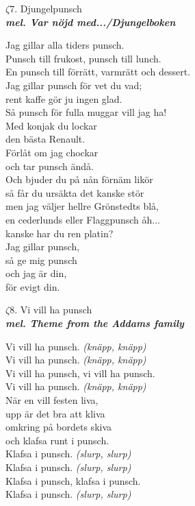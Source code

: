 \documentclass[a6paper,10pt]{article}
\newcommand{\mel}[1]{\small\textbf{\textit{mel. #1 \\}}}
\begin{document}
\setlength{\oddsidemargin}{-0.37in}
\noindent
\begin{center}
\Large $\zeta7$. Djungelpunsch \\ 
\mel{Var nöjd med.../Djungelboken}
\end{center}
Jag gillar alla tiders punsch.\\
Punsch till frukost, punsch till lunch.\\
En punsch till förrätt, varmrätt och dessert.\\
Jag gillar punsch för vet du vad;\\
rent kaffe gör ju ingen glad.\\
Så punsch för fulla muggar vill jag ha!
\vspace{5pt}\\
Med konjak du lockar\\
den bästa Renault.\\
Förlåt om jag chockar\\
och tar punsch ändå.\\
Och bjuder du på nån förnäm likör\\
så får du ursäkta det kanske stör\\
men jag väljer hellre Grönstedts blå,\\
en cederlunds eller Flaggpunsch åh...\\
kanske har du ren platin?\\
Jag gillar punsch,\\
så ge mig punsch\\
och jag är din,\\
för evigt din.\\

\setlength{\oddsidemargin}{-0.47in}
\noindent

\begin{center}
\Large $\zeta8$. Vi vill ha punsch \\ 
\mel{Theme from the Addams family}
\end{center}
Vi vill ha punsch. \textit{(knäpp, knäpp)}\\
Vi vill ha punsch. \textit{(knäpp, knäpp)}\\
Vi vill ha punsch, vi vill ha punsch.\\
Vi vill ha punsch. \textit{(knäpp, knäpp)}
\vspace{5pt}\\
När en vill festen liva,\\
upp är det bra att kliva\\
omkring på bordets skiva\\
och klafsa runt i punsch.
\vspace{5pt}\\
Klafsa i punsch. \textit{(slurp, slurp)}\\
Klafsa i punsch. \textit{(slurp, slurp)}\\
Klafsa i punsch, klafsa i punsch.\\
Klafsa i punsch. \textit{(slurp, slurp)}
\end{document}

